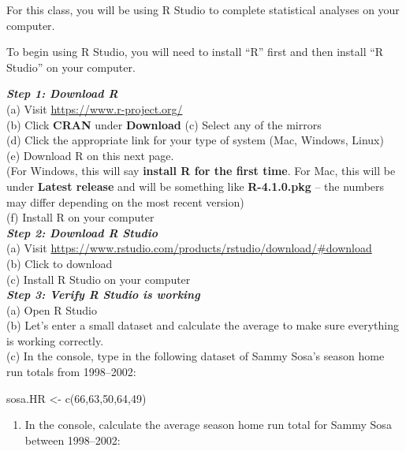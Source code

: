\documentclass[
]{book}
\newenvironment{Shaded}{\begin{snugshade}}{\end{snugshade}}
\newcommand{\DecValTok}[1]{\textcolor[rgb]{0.00,0.00,0.81}{#1}}
\newcommand{\FunctionTok}[1]{\textcolor[rgb]{0.00,0.00,0.00}{#1}}
\newcommand{\NormalTok}[1]{#1}
\newcommand{\OtherTok}[1]{\textcolor[rgb]{0.56,0.35,0.01}{#1}}
\providecommand{\tightlist}{%
  \setlength{\itemsep}{0pt}\setlength{\parskip}{0pt}}
\theoremstyle{definition}
\theoremstyle{definition}
\theoremstyle{definition}
\theoremstyle{definition}
\theoremstyle{remark}
\begin{document}
For this class, you will be using R Studio to complete statistical analyses on your computer.

To begin using R Studio, you will need to install ``R'' first and then install ``R Studio'' on your computer.

\textbf{\emph{Step 1: Download R}}\\
(a) Visit \url{https://www.r-project.org/}\\
(b) Click \textbf{CRAN} under \textbf{Download}
(c) Select any of the mirrors\\
(d) Click the appropriate link for your type of system (Mac, Windows, Linux)\\
(e) Download R on this next page.\\
(For Windows, this will say \textbf{install R for the first time}. For Mac, this will be under \textbf{Latest release} and will be something like \textbf{R-4.1.0.pkg} -- the numbers may differ depending on the most recent version)\\
(f) Install R on your computer\\

\textbf{\emph{Step 2: Download R Studio}}\\
(a) Visit \url{https://www.rstudio.com/products/rstudio/download/\#download}\\
(b) Click to download\\
(c) Install R Studio on your computer\\

\textbf{\emph{Step 3: Verify R Studio is working}}\\
(a) Open R Studio\\
(b) Let's enter a small dataset and calculate the average to make sure everything is working correctly.\\
(c) In the console, type in the following dataset of Sammy Sosa's season home run totals from 1998--2002:\\

\begin{Shaded}
\begin{Highlighting}[]
\NormalTok{sosa.HR }\OtherTok{\textless{}{-}} \FunctionTok{c}\NormalTok{(}\DecValTok{66}\NormalTok{,}\DecValTok{63}\NormalTok{,}\DecValTok{50}\NormalTok{,}\DecValTok{64}\NormalTok{,}\DecValTok{49}\NormalTok{)}
\end{Highlighting}
\end{Shaded}

\begin{enumerate}
\def\labelenumi{(\alph{enumi})}
\setcounter{enumi}{3}
\tightlist
\item
  In the console, calculate the average season home run total for Sammy Sosa between 1998--2002:\\
\end{enumerate}
\end{document}
